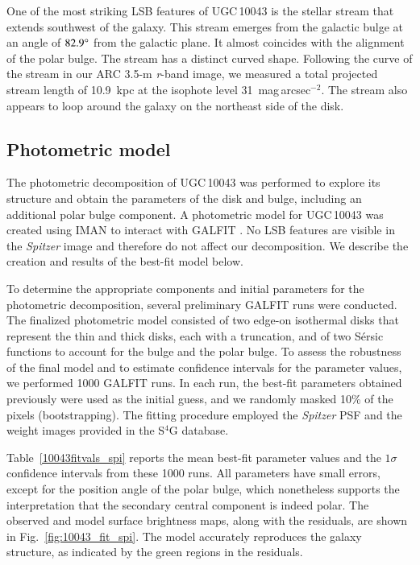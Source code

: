 \documentclass[letter]{aa}
\begin{document}
One of the most striking LSB features of UGC\,10043 is the stellar stream that extends southwest of the galaxy. This stream emerges from the galactic bulge at an angle of $82.9\degree$ from the galactic plane. It almost coincides with the alignment of the polar bulge. 
The stream has a distinct curved shape. Following the curve of the stream in our ARC 3.5-m {\it r}-band image, we measured a total projected stream length of 10.9~kpc at the isophote level 31~mag\,arcsec$^{-2}$. The stream also appears to loop around the galaxy on the northeast side of the disk.


\subsection{Photometric model} \label{sec:models}

The photometric decomposition of UGC\,10043 was performed to explore its structure and obtain the parameters of the disk and bulge, including an additional polar bulge component. A photometric model for UGC\,10043 was created using IMAN to interact with {\sc GALFIT} \citep{2010AJ....139.2097P}. No LSB features are visible in the {\it Spitzer} image and therefore do not affect our decomposition. We describe the creation and results of the best-fit model below.

To determine the appropriate components and initial parameters for the photometric decomposition, several preliminary {\sc GALFIT} runs were conducted. The finalized photometric model consisted of two edge-on isothermal disks that represent the thin and thick disks, each with a truncation, and of two S\'ersic functions to account for the bulge and the polar bulge. To assess the robustness of the final model and to estimate confidence intervals for the parameter values, we performed 1000 {\sc GALFIT} runs. In each run, the best-fit parameters obtained previously were used as the initial guess, and we randomly masked 10\% of the pixels (bootstrapping). The fitting procedure employed the {\it Spitzer} PSF and the weight images provided in the S$^4$G database.

Table~\ref{10043fitvals_spi} reports the mean best-fit parameter values and the $1\sigma$ confidence intervals from these 1000 runs. All parameters have small errors, except for the position angle of the polar bulge, which nonetheless supports the interpretation that the secondary central component is indeed polar. The observed and model surface brightness maps, along with the residuals, are shown in Fig.~\ref{fig:10043_fit_spi}. The model accurately reproduces the galaxy structure, as indicated by the green regions in the residuals. 
\end{document}
